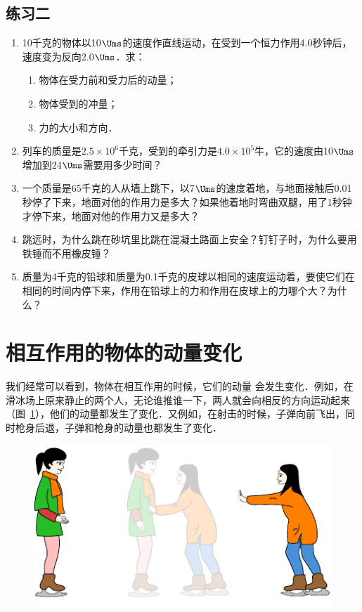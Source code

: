 \subsection*{练习二}
\begin{enumerate}
    \item 10千克的物体以10$\Ums$的速度作直线运动，在受到一个恒力作用4.0秒钟后，速度变为反向2.0$\Ums$．求：
     \begin{enumerate}
        \item 物体在受力前和受力后的动量；
        \item 物体受到的冲量；
        \item 力的大小和方向．
    \end{enumerate}
    \item 列车的质量是$2.5\times 10^6$千克，受到的牵引力是$4.0\times 
    10^5$牛，它的速度由10$\Ums$增加到24$\Ums$需要用多少时间？
    \item 一个质量是65千克的人从墙上跳下，以7$\Ums$的速度着地，与地面接触后0.01秒停了下来，地面对他的作用力是多大？如果他着地时弯曲双腿，用了1秒钟才停下来，地面对他的作用力又是多大？
    \item 跳远时，为什么跳在砂坑里比跳在混凝土路面上安全？钉钉子时，为什么要用铁锤而不用橡皮锤？
    \item 质量为4千克的铅球和质量为0.1千克的皮球以相同的速度运动着，要使它们在相同的时间内停下来，作用在铅球上的力和作用在皮球上的力哪个大？为什么？
\end{enumerate}

\section{相互作用的物体的动量变化}\label{sec-A-08-change-in-momentum-of-interacting-objects}
我们经常可以看到，物体在相互作用的时候，它们的动量
会发生变化．例如，在滑冰场上原来静止的两个人，无论谁推谁一下，两人就会向相反的方向运动起来（图~\ref{fig_A_8-2}），他们的动量都发生了变化．又例如，在射击的时候，子弹向前飞出，同时枪身后退，子弹和枪身的动量也都发生了变化．
\begin{figure}[htbp]
    \centering
    \includegraphics{fig/A/8-2.pdf}
    \caption{}\label{fig_A_8-2}
\end{figure}

